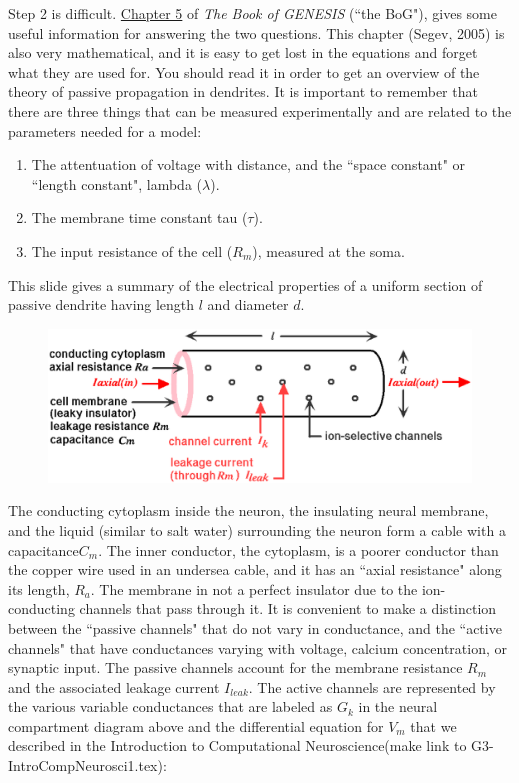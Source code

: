 \documentclass[12pt]{article}
\begin{document}
Step 2 is difficult. \href{../bog-ch5/bog-ch5.pdf}{Chapter 5} of {\it The Book of GENESIS} (``the BoG"), gives some useful information for answering the two questions. This chapter (Segev, 2005) is also very mathematical, and it is easy to get lost in the equations and forget what they are used for. You should read it in order to get an overview of the theory of passive propagation in dendrites. It is important to remember that there are three things that can be measured experimentally and are related to the parameters needed for a model:

\begin{enumerate}
\item The attentuation of voltage with distance, and the ``space constant" or ``length constant", lambda ($\lambda$).

\item The membrane time constant tau ($\tau$).

\item The input resistance of the cell ($R_m$), measured at the soma.
\end{enumerate}

This slide gives a summary of the electrical properties of a uniform section of passive dendrite having length $l$ and diameter $d$.

\begin{figure}[h]
  \centering
 \includegraphics[scale=0.4]{figures/dendrite_section2.eps}
  \label{fig:dendrite2}
\end{figure}

The conducting cytoplasm inside the neuron, the insulating neural membrane, and the liquid (similar to salt water) surrounding the neuron form a cable with a capacitance$ C_m$. The inner conductor, the cytoplasm, is a poorer conductor than the copper wire used in an undersea cable, and it has an ``axial resistance" along its length, $R_a$. The membrane in not a perfect insulator due to the ion-conducting channels that pass through it. It is convenient to make a distinction between the ``passive channels" that do not vary in conductance, and the ``active channels" that have conductances varying with voltage, calcium concentration, or synaptic input. The passive channels account for the membrane resistance $R_m$ and the associated leakage current $I_{leak}$. The active channels are represented by the various variable conductances that are labeled as $G_k$ in the neural compartment diagram above and the differential equation for $V_m$ that we described in the Introduction to Computational Neuroscience(make link to G3-IntroCompNeurosci1.tex):
\end{document}
